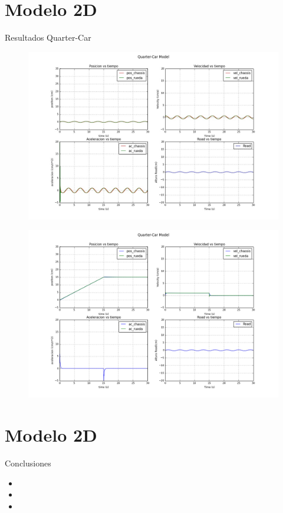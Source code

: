 \documentclass{beamer}
\begin{document}
\section{Modelo 2D}
\begin{frame}{Resultados Quarter-Car}

 \begin{figure}[h]
\centering
\includegraphics[scale=0.35]{1_resorte}

\end{figure}
\begin{figure}[h]
\centering
\includegraphics[scale=0.35]{quarter_sim_pendiente}

\end{figure}

\vskip 1cm
\end{frame}

\section{Modelo 2D}
\begin{frame}{Conclusiones}
\begin{itemize}
 \item
 \item
 \item
\end{itemize}
\vskip 1cm
\end{frame}
\end{document}
